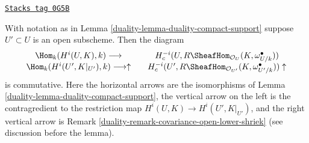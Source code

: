 \begin{lemma}
\label{duality-lemma-duality-compact-support-restrict-open}
\href{https://stacks.math.columbia.edu/tag/0G5B}{\texttt{Stacks tag 0G5B}}

With notation as in Lemma \ref{duality-lemma-duality-compact-support}
suppose $U' \subset U$ is an open subscheme. Then the diagram
$$
\begin{array}{ccc}\Hom_k(H^i(U, K), k) \longrightarrow &  & H^{-i}_c(U, R\SheafHom_{\mathcal{O}_U}(K, \omega_{U/k}^\bullet)) \\ \Hom_k(H^i(U', K|_{U'}), k) \longrightarrow\uparrow &  & H^{-i}_c(U', R\SheafHom_{\mathcal{O}_{U'}}(K, \omega_{U'/k}^\bullet)) \uparrow\end{array}
$$
is commutative. Here the horizontal arrows are the isomorphisms of
Lemma \ref{duality-lemma-duality-compact-support}, the vertical arrow on the
left is the contragredient to the restriction map
$H^i(U, K) \to H^i(U', K|_{U'})$, and the right vertical arrow
is Remark \ref{duality-remark-covariance-open-lower-shriek} (see discussion
before the lemma).
\end{lemma}

